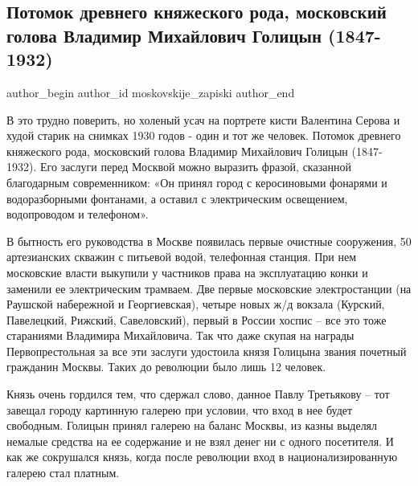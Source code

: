  
 
 
 
 
 
\subsection{Потомок древнего княжеского рода, московский голова Владимир Михайлович Голицын (1847-1932)}
\label{sec:07_09_2021.fb.moskovskije_zapiski.1.vladimir_golicyn_moskva}
 
\ifcmt
 author_begin
   author_id moskovskije_zapiski
 author_end
\fi

В это трудно поверить, но холеный усач на портрете кисти Валентина Серова и
худой старик на снимках 1930 годов - один и тот же человек. Потомок древнего
княжеского рода, московский голова Владимир Михайлович Голицын (1847-1932). Его
заслуги перед Москвой можно выразить фразой, сказанной благодарным
современником: «Он принял город с керосиновыми фонарями и водоразборными
фонтанами, а оставил с электрическим освещением, водопроводом и телефоном».


В бытность его руководства в Москве появилась первые очистные сооружения, 50
артезианских скважин с питьевой водой, телефонная станция. При нем московские
власти выкупили у частников права на эксплуатацию конки и заменили ее
электрическим трамваем. Две первые московские электростанции (на Раушской
набережной и Георгиевская), четыре новых ж/д вокзала (Курский, Павелецкий,
Рижский, Савеловский), первый в России хоспис – все это тоже стараниями
Владимира Михайловича. Так что даже скупая на награды Первопрестольная за все
эти заслуги удостоила князя Голицына звания почетный гражданин Москвы. Таких до
революции было лишь 12 человек.

Князь очень гордился тем, что сдержал слово, данное Павлу Третьякову – тот
завещал городу картинную галерею при условии, что вход в нее будет свободным.
Голицын принял галерею на баланс Москвы, из казны выделял немалые средства на
ее содержание и не взял денег ни с одного посетителя. И как же сокрушался
князь, когда после революции вход в национализированную галерею стал платным.

